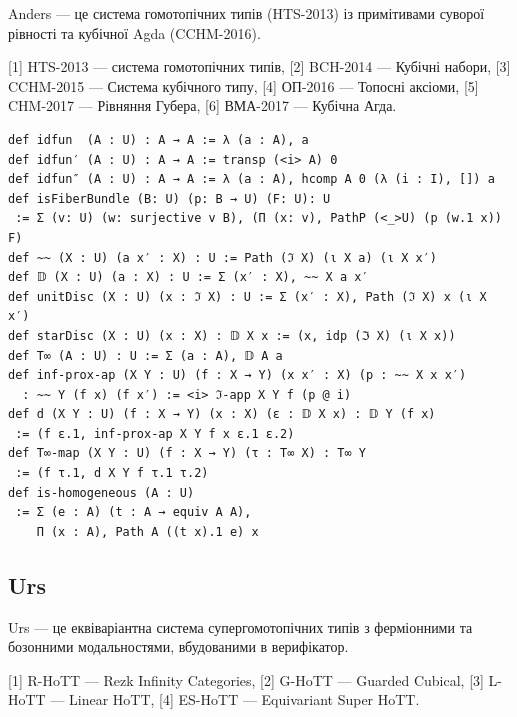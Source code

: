 Anders — це система гомотопічних типів (HTS-2013) із примітивами суворої рівності та кубічної Agda (CCHM-2016).

[1] HTS-2013 — система гомотопічних типів,
[2] BCH-2014 — Кубічні набори,
[3] CCHM-2015 — Система кубічного типу,
[4] ОП-2016 — Топосні аксіоми,
[5] CHM-2017 — Рівняння Губера,
[6] ВМА-2017 — Кубічна Агда.

\begin{lstlisting}
def idfun  (A : U) : A → A := λ (a : A), a
def idfun′ (A : U) : A → A := transp (<i> A) 0
def idfun″ (A : U) : A → A := λ (a : A), hcomp A 0 (λ (i : I), []) a
def isFiberBundle (B: U) (p: B → U) (F: U): U
 := Σ (v: U) (w: surjective v B), (Π (x: v), PathP (<_>U) (p (w.1 x)) F)
def ~~ (X : U) (a x′ : X) : U := Path (ℑ X) (ι X a) (ι X x′)
def 𝔻 (X : U) (a : X) : U := Σ (x′ : X), ~~ X a x′
def unitDisc (X : U) (x : ℑ X) : U := Σ (x′ : X), Path (ℑ X) x (ι X x′)
def starDisc (X : U) (x : X) : 𝔻 X x := (x, idp (ℑ X) (ι X x))
def T∞ (A : U) : U := Σ (a : A), 𝔻 A a
def inf-prox-ap (X Y : U) (f : X → Y) (x x′ : X) (p : ~~ X x x′)
  : ~~ Y (f x) (f x′) := <i> ℑ-app X Y f (p @ i)
def d (X Y : U) (f : X → Y) (x : X) (ε : 𝔻 X x) : 𝔻 Y (f x)
 := (f ε.1, inf-prox-ap X Y f x ε.1 ε.2)
def T∞-map (X Y : U) (f : X → Y) (τ : T∞ X) : T∞ Y
 := (f τ.1, d X Y f τ.1 τ.2)
def is-homogeneous (A : U)
 := Σ (e : A) (t : A → equiv A A),
    Π (x : A), Path A ((t x).1 e) x
\end{lstlisting}

\subsection*{Urs}

Urs — це еквіваріантна система супергомотопічних типів з ферміонними та бозонними модальностями,
вбудованими в верифікатор.

[1] R-HoTT — Rezk Infinity Categories,
[2] G-HoTT — Guarded Cubical,
[3] L-HoTT — Linear HoTT,
[4] ES-HoTT — Equivariant Super HoTT.

